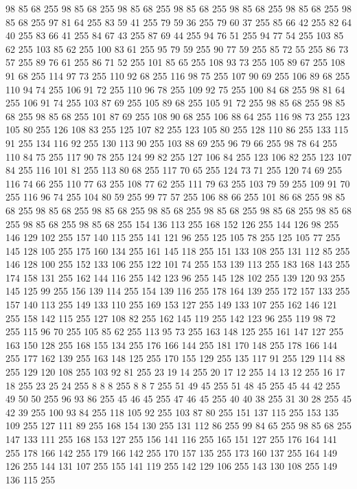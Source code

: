 98 85 68 255 98 85 68 255 98 85 68 255 98 85 68 255 98 85 68 255 98 85 68 255 98 85 68 255 97 81 64 255 83 59 41 255 79 59 36 255 79 60 37 255 85 66 42 255 82 64 40 255 83 66 41 255 84 67 43 255 87 69 44 255 94 76 51 255 94 77 54 255 103 85 62 255 103 85 62 255 100 83 61 255 95 79 59 255 90 77 59 255 85 72 55 255 86 73 57 255 89 76 61 255 86 71 52 255 101 85 65 255 108 93 73 255 105 89 67 255 108 91 68 255 114 97 73 255 110 92 68 255 116 98 75 255 107 90 69 255 106 89 68 255 110 94 74 255 106 91 72 255 110 96 78 255 109 92 75 255 100 84 68 255 98 81 64 255 106 91 74 255 103 87 69 255 105 89 68 255 105 91 72 255 98 85 68 255 98 85 68 255 98 85 68 255 101 87 69 255 108 90 68 255 106 88 64 255 116 98 73 255 123 105 80 255 126 108 83 255 125 107 82 255 123 105 80 255 128 110 86 255 133 115 91 255 134 116 92 255 130 113 90 255 103 88 69 255 96 79 66 255 98 78 64 255
110 84 75 255 117 90 78 255 124 99 82 255 127 106 84 255 123 106 82 255 123 107 84 255 116 101 81 255 113 80 68 255 117 70 65 255 124 73 71 255 120 74 69 255 116 74 66 255 110 77 63 255 108 77 62 255 111 79 63 255 103 79 59 255 109 91 70 255 116 96 74 255 104 80 59 255 99 77 57 255 106 88 66 255 101 86 68 255 98 85 68 255 98 85 68 255 98 85 68 255 98 85 68 255 98 85 68 255 98 85 68 255 98 85 68 255 98 85 68 255 98 85 68 255 154 136 113 255 168 152 126 255 144 126 98 255 146 129 102 255 157 140 115 255 141 121 96 255 125 105 78 255 125 105 77 255 145 128 105 255 175 160 134 255 161 145 118 255 151 133 108 255 131 112 85 255 146 128 100 255 152 133 106 255 122 101 74 255 153 139 113 255 183 168 143 255 174 158 131 255 162 144 116 255 142 123 96 255 145 128 102 255 139 120 93 255 145 125 99 255 156 139 114 255 154 139 116 255 178 164 139 255 172 157 133 255 157 140 113 255 149 133 110 255 169 153 127 255 149 133 107 255 162 146 121 255
158 142 115 255 127 108 82 255 162 145 119 255 142 123 96 255 119 98 72 255 115 96 70 255 105 85 62 255 113 95 73 255 163 148 125 255 161 147 127 255 163 150 128 255 168 155 134 255 176 166 144 255 181 170 148 255 178 166 144 255 177 162 139 255 163 148 125 255 170 155 129 255 135 117 91 255 129 114 88 255 129 120 108 255 103 92 81 255 23 19 14 255 20 17 12 255 14 13 12 255 16 17 18 255 23 25 24 255 8 8 8 255 8 8 7 255 51 49 45 255 51 48 45 255 45 44 42 255 49 50 50 255 96 93 86 255 45 46 45 255 47 46 45 255 40 40 38 255 31 30 28 255 45 42 39 255 100 93 84 255 118 105 92 255 103 87 80 255 151 137 115 255 153 135 109 255 127 111 89 255 168 154 130 255 131 112 86 255 99 84 65 255 98 85 68 255 147 133 111 255 168 153 127 255 156 141 116 255 165 151 127 255 176 164 141 255 178 166 142 255 179 166 142 255 170 157 135 255 173 160 137 255 164 149 126 255 144 131 107 255 155 141 119 255 142 129 106 255 143 130 108 255 149 136 115 255
